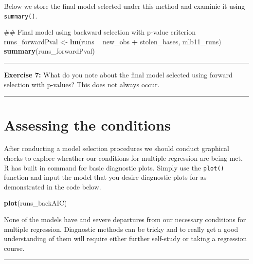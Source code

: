 \documentclass[]{book}
\newenvironment{Shaded}{\begin{snugshade}}{\end{snugshade}}
\newcommand{\KeywordTok}[1]{\textcolor[rgb]{0.13,0.29,0.53}{\textbf{#1}}}
\newcommand{\StringTok}[1]{\textcolor[rgb]{0.31,0.60,0.02}{#1}}
\newcommand{\OperatorTok}[1]{\textcolor[rgb]{0.81,0.36,0.00}{\textbf{#1}}}
\newcommand{\NormalTok}[1]{#1}
\theoremstyle{definition}
\theoremstyle{definition}
\theoremstyle{definition}
\theoremstyle{remark}
\begin{document}
Below we store the final model selected under this method and examinie
it using \texttt{summary()}.

\begin{Shaded}
\begin{Highlighting}[]
\NormalTok{## Final model using backward selection with p-value criterion}
\NormalTok{runs_forwardPval <-}\StringTok{ }\KeywordTok{lm}\NormalTok{(runs }\OperatorTok{~}\StringTok{ }\NormalTok{new_obs }\OperatorTok{+}\StringTok{ }\NormalTok{stolen_bases, mlb11_runs)}
\KeywordTok{summary}\NormalTok{(runs_forwardPval)}
\end{Highlighting}
\end{Shaded}

\begin{center}\rule{0.5\linewidth}{\linethickness}\end{center}

\textbf{Exercise 7:} What do you note about the final model selected
using forward selection with p-values? This does not always occur.

\begin{center}\rule{0.5\linewidth}{\linethickness}\end{center}

\section{Assessing the conditions}\label{assessing-the-conditions}

After conducting a model selection procedures we should conduct
graphical checks to explore wheather our conditions for multiple
regression are being met. R has built in command for basic diagnostic
plots. Simply use the \texttt{plot()} function and input the model that
you desire diagnostic plots for as demonstrated in the code below.

\begin{Shaded}
\begin{Highlighting}[]
\KeywordTok{plot}\NormalTok{(runs_backAIC)}
\end{Highlighting}
\end{Shaded}

None of the models have and severe departures from our necessary
conditions for multiple regression. Diagnostic methods can be tricky and
to really get a good understanding of them will require either further
self-study or taking a regression course.

\begin{center}\rule{0.5\linewidth}{\linethickness}\end{center}
\end{document}

